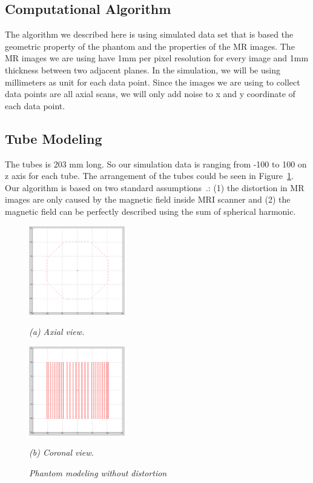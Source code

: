 \subsection{Computational Algorithm}

The algorithm we described here is using simulated data set that is based the
geometric property of the phantom and the properties of the MR images.
The MR images we are using have 1mm per pixel resolution for every image and
1mm thickness between two adjacent planes. In the simulation, we will be using millimeters as unit for
each data point. Since the images we are using to collect data points are all axial scans,
we will only add noise to x and y coordinate of each data point.

\subsection{Tube Modeling}

The tubes is 203 mm long. So our simulation data is ranging from -100 to 100 on z axis for each tube.
The arrangement of the tubes could be seen in Figure~\ref{fig:1}.
Our algorithm is based on two standard assumptions~\cite{LSS06a,LSS06b,LSS08a,LSS08b,Lang99}.: (1) the distortion in MR images are only caused by the magnetic field inside MRI scanner and (2) the magnetic field can be perfectly described using the sum of spherical harmonic.

\begin{figure}[htb]

  \begin{minipage}[b]{1.65in}
    \centering
    \centerline{\mbox{\includegraphics[width=1.65in]{isocenter/images/simulation/axial_no_distortion.eps}}}
    \centerline{\emph{(a) Axial view.}}\medskip
  \end{minipage}
  \hfill
  \begin{minipage}[b]{1.65in}
    \centering
    \centerline{\mbox{\includegraphics[width=1.65in]{isocenter/images/simulation/coronal_no_distortion.eps}}}
    \centerline{\emph{(b) Coronal view.}}\medskip
  \end{minipage}
%
\caption{\emph{Phantom modeling without distortion}} \label{fig:1}
%
\end{figure}

